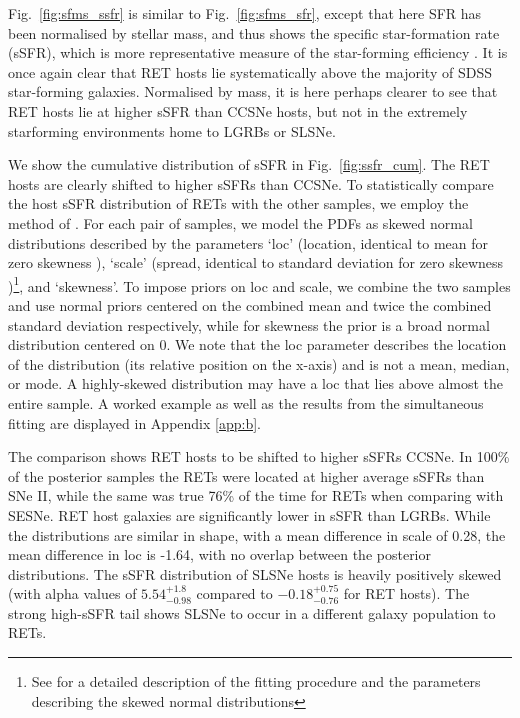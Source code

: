 \documentclass[fleqn,usenatbib,]{mnras}
\newcommand{\replychris}[1]{\color{magenta}#1 \color{black}}
\newcommand{\replylluis}[1]{\color{green}#1 \color{black}}
\begin{document}
Fig.~\ref{fig:sfms_ssfr} is similar to Fig.~\ref{fig:sfms_sfr}, except that here SFR has been normalised by stellar mass, and thus shows the specific star-formation rate (sSFR), which is more representative measure of the star-forming \replylluis{efficiency}. It is once again clear that RET hosts lie systematically above the majority of SDSS star-forming galaxies. Normalised by mass, it is here perhaps clearer to see that RET hosts lie at higher sSFR than CCSNe hosts, but not in the extremely starforming environments home to LGRBs or SLSNe.

We show the cumulative distribution of sSFR in Fig.~\ref{fig:ssfr_cum}. The RET hosts are clearly shifted to higher sSFRs than CCSNe. To statistically compare the host sSFR distribution of RETs with the other samples, we employ the method of \citet{Wiseman2020}. For each pair of samples, we model the PDFs as skewed normal distributions \replylluis{described by the parameters `loc' (location, identical to mean \replychris{for zero skewness}), `scale' (spread, identical to standard deviation for \replychris{zero skewness})\footnote{See \citet{Wiseman2020} for a detailed description of the fitting procedure and the parameters describing the skewed normal distributions}, and `skewness'. To impose priors on loc and scale, we combine the two samples and use normal priors centered on the combined mean and twice the combined standard deviation respectively, while for skewness the prior is a broad normal distribution centered on 0. We note that the loc parameter describes the location of the distribution (its relative position on the x-axis) and is not a mean, median, or mode. A highly-skewed distribution may have a loc that lies above almost the entire sample. A worked example as well as} the results from the simultaneous fitting are displayed in Appendix \ref{app:b}. 

The comparison shows RET hosts to be shifted to higher sSFRs CCSNe. In 100\% of the posterior samples the RETs were located at higher average sSFRs than SNe II, while the same was true 76\% of the time for RETs when comparing with SESNe. 
RET host galaxies are significantly lower in sSFR than LGRBs. While the distributions are similar in shape, with a mean difference in scale of 0.28, the mean difference in loc is -1.64, with no overlap between the posterior distributions. The sSFR distribution of SLSNe hosts is heavily positively skewed (with alpha values of $5.54^{+1.8}_{-0.98}$ compared to $-0.18^{+0.75}_{-0.76}$ for RET hosts). The strong high-sSFR tail shows SLSNe to \replychris{occur in a different galaxy }population to RETs.
\end{document}
